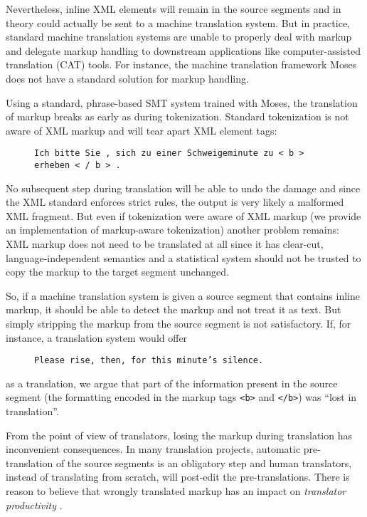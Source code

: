 \documentclass[11pt,letterpaper]{article}
\begin{document}
Nevertheless, inline XML elements will remain in the source segments and in theory could actually be sent to a machine translation system. But in practice, standard machine translation systems are unable to properly deal with markup and delegate markup handling to downstream applications like computer-assisted translation (CAT) tools. For instance, the machine translation framework Moses \cite{koehn2007moses} does not have a standard solution for markup handling.

Using a standard, phrase-based SMT system trained with Moses, the translation of markup breaks as early as during tokenization. Standard tokenization is not aware of XML markup and will tear apart XML element tags:

\begin{figure}[h]
\texttt{Ich bitte Sie , sich zu einer Schweigeminute zu < b > erheben < / b > .}

\end{figure}

\noindent No subsequent step during translation will be able to undo the damage and since the XML standard enforces strict rules, the output is very likely a malformed XML fragment. But even if tokenization were aware of XML markup (we provide an implementation of markup-aware tokenization) another problem remains: XML markup does not need to be translated at all since it has clear-cut, language-independent semantics and a statistical system should not be trusted to copy the markup to the target segment unchanged.

So, if a machine translation system is given a source segment that contains inline markup, it should be able to detect the markup and not treat it as text. But simply stripping the markup from the source segment is not satisfactory. If, for instance, a translation system would offer

\begin{figure}[h]

\texttt{Please rise, then, for this minute's silence.}
\end{figure}

\noindent as a translation, we argue that part of the information present in the source segment (the formatting encoded in the markup tags \texttt{<b>} and \texttt{</b>}) was ``lost in translation''.

From the point of view of translators, losing the markup during translation has inconvenient consequences. In many translation projects, automatic pre-translation of the source segments is an obligatory step and human translators, instead of translating from scratch, will post-edit the pre-translations. There is reason to believe that wrongly translated markup has an impact on \textit{translator productivity} \cite{obrien2011towards}.
\end{document}
